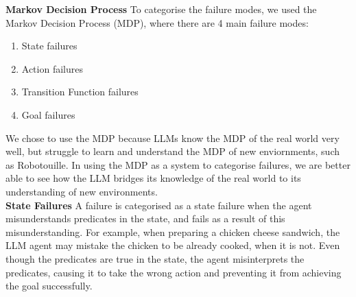 \textbf{Markov Decision Process}
To categorise the failure modes, we used the Markov Decision Process (MDP), where there are 4 main failure modes:
\begin{enumerate}
    \item State failures
    \item Action failures
    \item Transition Function failures
    \item Goal failures
\end{enumerate}
We chose to use the MDP because LLMs know the MDP of the real world very well, but struggle to learn and understand the MDP of new enviornments, such as Robotouille. In using the MDP as a system to categorise failures, we are better able to see how the LLM bridges its knowledge of the real world to its understanding of new environments. \\

\textbf{State Failures}
A failure is categorised as a state failure when the agent misunderstands predicates in the state, and fails as a result of this misunderstanding. For example, when preparing a chicken cheese sandwich, the LLM agent may mistake the chicken to be already cooked, when it is not. Even though the predicates are true in the state, the agent misinterprets the predicates, causing it to take the wrong action and preventing it from achieving the goal successfully. 


